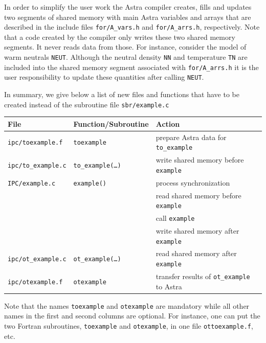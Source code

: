 \documentclass[12pt]{article}
\newcommand{\tw}[1]{\texttt{#1}}
\begin{document}
In order to simplify the user work the Astra compiler creates, fills and
updates two segments of shared memory with main Astra variables and arrays
that are described in the include files \tw{for/A\_vars.h} and
\tw{for/A\_arrs.h}, respectively. 
Note that a code created by the compiler only writes these two shared memory
segments.
It never reads data from those. 
For instance, consider the model of warm neutrals \tw{NEUT}. 
Although the neutral density \tw{NN} and temperature \tw{TN} are included
into the shared memory segment associated with \tw{for/A\_arrs.h} it is the
user responsibility to update these quantities after calling \tw{NEUT}.

In summary, we give below a list of new files and functions that have to be
created instead of the subroutine file \tw{sbr/example.c}

\vspace*{-\parskip}
\begin{center}
\begin{tabular}{|l|l|l|}
\hline
File & Function/Subroutine & Action \\
\hline
\tw{ipc/toexample.f}   & \tw{toexample}
                 & prepare Astra data for \tw{to\_example}\\
\tw{ipc/to\_example.c} & \tw{to\_example(\dots)} 
                 & write shared memory before \tw{example} \\
\hline
\tw{IPC/example.c} & \tw{example()} 
                         & process synchronization      \\
                 & 
                 & read shared memory before \tw{example}   \\
                 & %
                 & call \tw{example}       \\
                 & %
                 & write shared memory after \tw{example}    \\
\hline
\tw{ipc/ot\_example.c} & \tw{ot\_example(\dots)} 
                 & read shared memory after \tw{example}   \\
\tw{ipc/otexample.f}   & \tw{otexample}
                 & transfer results of \tw{ot\_example} to Astra\\
\hline
\end{tabular}
\end{center}
Note that the names \tw{toexample} and \tw{otexample} are mandatory while all
other names in the first and second columns are optional.
For instance, one can put the two Fortran subroutines, \tw{toexample} and
\tw{otexample}, in one file \tw{ottoexample.f},  etc.
\end{document}
